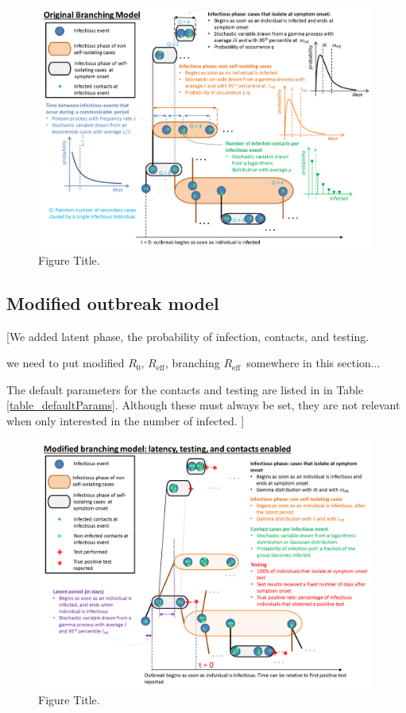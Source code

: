 \documentclass[sr]{drdc-report}
\def\Rz{\ensuremath{R_0}}
\def\Reff{\ensuremath{R_\mathrm{eff}}}
\begin{document}
\begin{figure}
  \includegraphics[width=0.99\textwidth, keepaspectratio=true]{figures/BranchingModel}
  \caption{Figure Title.}\label{fig_branchingModel}
\end{figure}


\subsection{Modified outbreak model}
[We added latent phase, the probability of infection, contacts, and testing.

we need to put modified \Rz, \Reff, branching \Reff\ somewhere in this section... 

The default parameters for the contacts and testing are listed in in Table \ref{table_defaultParams}. Although these must always be set, they are not relevant when only interested in the number of infected. ]

\begin{figure}
  \includegraphics[width=0.99\textwidth, keepaspectratio=true]{figures/ModifiedBranchingModel}
  \caption{Figure Title.}\label{fig_branchingModel}
\end{figure}
\end{document}
